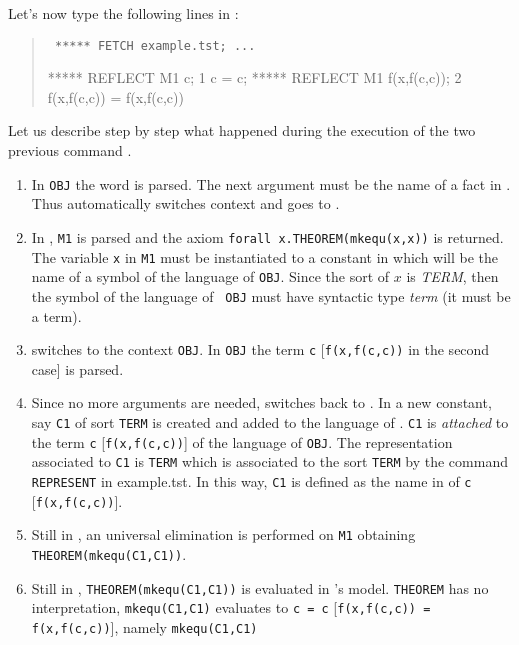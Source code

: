 {	Let's now type the following lines in {\GF}:

	\begin{quote}\tt
	   ***** FETCH example.tst;
	   ...

	   ***** REFLECT M1 c;
	   1  c = c;
	   ***** REFLECT M1 f(x,f(c,c));
	   2  f(x,f(c,c)) = f(x,f(c,c))
	\end{quote}

	Let us describe  step by step what happened during  the execution of
	the two  previous command .

	\begin{enumerate}
	\item
    In {\tt OBJ} the word   is parsed.
    The next argument must be  the name of a fact  in {\meta}.  Thus {\GF}
    automatically switches context and goes to {\meta}.
	\item
    In  {\meta}, {\tt M1} is parsed  and the axiom
    {\tt forall  x.THEOREM(mkequ(x,x))} is returned.  The variable {\tt x}
    in {\tt M1} must be instantiated  to a constant  in {\meta} which will
    be the name of a symbol of the language  of {\tt OBJ}.   Since the
    sort of  $x$ is {\em TERM}, then  the symbol of  the language  of {\tt
    OBJ}  must have  syntactic  type {\em term}   (it must be  a term).
	\item
    {\GF} switches to the context {\tt OBJ}.
    In  {\tt OBJ} the   term  {\tt  c} [{\tt f(x,f(c,c))} in  the second case]
    is  parsed.  
	\item
    Since no more arguments are needed, {\GF} switches back to {\meta}.
    In {\meta} a new constant, say {\tt C1} of sort {\tt TERM} is created and
    added to the language of {\meta}.
    {\tt   C1} is {\em attached} to the term {\tt c}  [{\tt f(x,f(c,c))}] 
    of the language of {\tt OBJ}.  
    The representation associated to {\tt C1} is {\tt TERM} which is associated
    to the sort {\tt TERM} by the command {\tt REPRESENT} in example.tst.
    In this way,  {\tt C1} is defined  as the name in  {\meta} 
    of {\tt c} [{\tt f(x,f(c,c))}].   
	\item
    Still in {\meta}, an   universal elimination is performed on {\tt  M1}
    obtaining\\
    {\tt THEOREM(mkequ(C1,C1))}.
	\item
    Still in {\meta}, {\tt  THEOREM(mkequ(C1,C1))} is evaluated in {\meta}'s 
    model.
    {\tt THEOREM} has no interpretation, {\tt mkequ(C1,C1)} evaluates to 
    {\tt c = c} [{\tt f(x,f(c,c)) = f(x,f(c,c))}], namely {\tt mkequ(C1,C1)}

\end{enumerate}}
